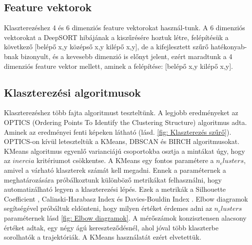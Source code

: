 \documentclass[acmtog, authorversion]{acmart}
\begin{document}
\subsection{Feature vektorok}
Klaszterezéshez 4 és 6 dimenziós feature vektorokat használ-tunk. A 6 dimenziós vektorokat a DeepSORT hibájának a kiszűrésére hoztuk
létre, felépítésük a következő [belépő x,y középső x,y kilépő x,y], de a kifejlesztett szűrő hatékonyab-bnak bizonyult, és a kevesebb dimenzió is előnyt jelent,
ezért maradtunk a 4 dimenziós feature vektor mellett, aminek a felépítése: [belépő x,y kilépő x,y].
\subsection{Klaszterezési algoritmusok}
Klaszterezéshez több fajta algoritmust teszteltünk. A legjobb eredményeket az OPTICS (Ordering Points To Identify the Clustering Structure) \cite{10.1145/304181.304187} algoritmus adta. 
Aminek az eredményei fenti képeken látható (lásd. \ref{fig: Klaszterezés szűrő}).
OPTICS-on kívül leteszteltük a KMeans, DBSCAN és BIRCH algoritmusokat. KMeans algoritmus egyenlő varianciájú csoportokba osztja a mintákat úgy,
hogy az \begin{math}inercia\end{math} kritériumot csökkentse. A KMeans egy fontos paramétere a \begin{math}n_clusters\end{math}, amivel a várható
klaszterek számát kell megadni. Ennek a paraméternek a meghatározására próbálkoztunk különböző metrikákat felhasználni, hogy automatizálható legyen
a klaszterezési lépés. Ezek a metrikák a Silhouette Coefficient \cite{ROUSSEEUW198753}, Calinski-Harabasz Index \cite{article} és Davies-Bouldin Index \cite{4766909}.
Elbow diagramok segítségével próbáltuk eldönteni, hogy milyen értéket érdemes adni az \begin{math}n_clusters\end{math} paraméternek lásd \ref{fig: Elbow diagramok}.
A mérőszámok konzisztensen alacsony értéket adtak, egy négy ágú kereszteződésnél, ahol jóval több klaszterbe sorolhatók a trajektóriák. A KMeans használatát
ezért elvetettük.
\end{document}
